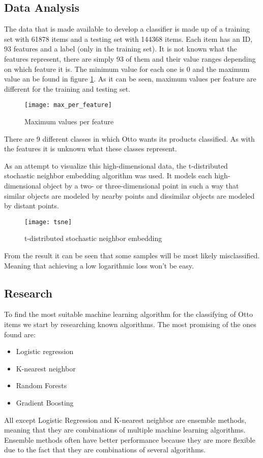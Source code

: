 \subsection{Data Analysis}

The data that is made available to develop a classifier is made up of a training set with 61878 items and a testing set with 144368 items. Each item has an ID, 93 features and a label (only in the training set). It is not known what the features represent, there are simply 93 of them and their value ranges depending on which feature it is. The minimum value for each one is 0 and the maximum value an be found in figure \ref{fig:max_per_feature}. As it can be seen, maximum values per feature are different for the training and testing set.
\begin{figure}[h!]
    \texttt{[image: max\_per\_feature]}
    \caption{Maximum values per feature}
    \label{fig:max_per_feature}
\end{figure}

There are 9 different classes in which Otto wants its products classified. As with the features it is unknown what these classes represent.

As an attempt to visualize this high-dimensional data, the t-distributed stochastic neighbor embedding algorithm was used. It models each high-dimensional object by a two- or three-dimensional point in such a way that similar objects are modeled by nearby points and dissimilar objects are modeled by distant points.
\begin{figure}[h!]
    \centering
    \texttt{[image: tsne]}
    \caption{t-distributed stochastic neighbor embedding}
    \label{fig:Tsne}
\end{figure}

From the result it can be seen that some samples will be most likely misclassified. Meaning that achieving a low logarithmic loss won't be easy.
\subsection{Research}
To find the most suitable machine learning algorithm for the classifying of Otto items we start by researching known algorithms. The most promising of the ones found are:
\begin{itemize}
\item Logistic regression
\item K-nearest neighbor
\item Random Forests
\item Gradient Boosting
\end{itemize}
All except Logistic Regression and K-nearest neighbor are ensemble methods, meaning that they are combinations of multiple machine learning algorithms. Ensemble methods often have better performance because they are more flexible due to the fact that they are combinations of several algorithms.\\
